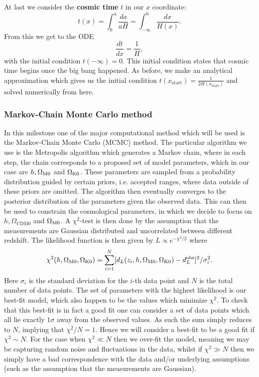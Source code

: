 \documentclass[%
reprint,
 amsmath,amssymb,
 aps,
]{revtex4-2}
\begin{document}
At last we consider the \textbf{cosmic time} $t$ in our $x$ coordinate:
\[t(x)=\int_0^a\frac{da}{aH}=\int_{-\infty}^0\frac{dx}{H(x)}.\]
From this we get to the ODE
\begin{equation}
	\frac{dt}{dx}=\frac{1}{H}, \label{eq:dtdx}
\end{equation}
with the initial condition $t(-\infty)=0$. This initial condition states that cosmic time begins once the big bang happened. As before, we make an analytical approximation which gives us the initial condition $t(x_\text{start})=\frac{1}{2H(x_\text{start})}$ and solved numerically from here.

\subsubsection{Markov-Chain Monte Carlo method}
In this milestone one of the major computational method which will be used is the Markov-Chain Monte Carlo (MCMC) method. The particular algorithm we use is the Metropolis algorithm which generates a Markov chain, where in each step, the chain corresponds to a proposed set of model parameters, which in our case are $h, \Omega_{\text M0}$ and $\Omega_{\text K0}$. These parameters are sampled from a probability distribution guided by certain priors, i.e. accepted ranges, where data outside of these priors are omitted. The algorithm then eventually converges to the posterior distribution of the parameters given the observed data. This can then be used to constrain the cosmological parameters, in which we decide to focus on $h, \Omega_{\text{CDM}0}$ and $\Omega_{\text M0}$. A $\chi^2$-test is then done by the assumption that the measurements are Gaussian distributed and uncorrelated between different redshift. The likelihood function is then given by $L\propto e^{-\chi^2/2}$ where
\[\chi^2(h,\Omega_{\text M0},\Omega_{\text K0})=\sum_{i=1}^N[d_L(z_i,h,\Omega_{\text M0},\Omega_{\text K0})-d_L^\text{obs}]^2/\sigma_i^2.\]
Here $\sigma_i$ is the standard deviation for the $i$-th data point and $N$ is the total number of data points. The set of parameters with the highest likelihood is our best-fit model, which also happen to be the values which minimize $\chi^2$. To check that this best-fit is in fact a good fit one can consider a set of data points which all lie exactly $1\sigma$ away from the observed values. As such the sum simply reduces to $N$, implying that $\chi^2/N=1$. Hence we will consider a best-fit to be a good fit if $\chi^2\sim N$. For the case when $\chi^2\ll N$ then we over-fit the model, meaning we may be capturing random noise and fluctuations in the data, whilst if $\chi^2\gg N$ then we simply have a bad correspondence with the data and/or underlying assumptions (such as the assumption that the measurements are Gaussian).
\end{document}
